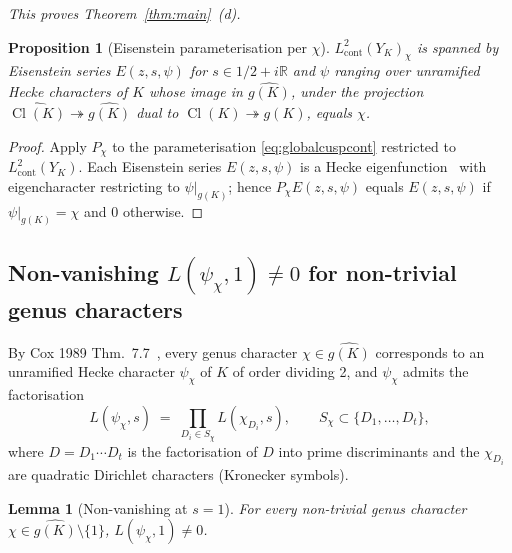 \documentclass[11pt,a4paper,reqno]{amsart}
\newtheorem{proposition}[theorem]{Proposition}
\newtheorem{lemma}[theorem]{Lemma}
\theoremstyle{definition}
\DeclareMathOperator{\Cl}{Cl}
\newcommand{\RR}{\mathbb{R}}
\newcommand{\YK}{Y_K}
\newcommand{\gK}{g(K)}
\newcommand{\dualgK}{\widehat{g(K)}}
\newcommand{\Lcont}{L^2_{\mathrm{cont}}}
\begin{document}
\emph{This proves Theorem~\ref{thm:main}~(d).}

\begin{proposition}[Eisenstein parameterisation per $\chi$]\label{prop:Eisparam}
$\Lcont(\YK)_\chi$ is spanned by Eisenstein series $E(z,s,\psi)$ for $s\in 1/2+i\RR$ and $\psi$ ranging over unramified Hecke characters of $K$ whose image in $\dualgK$, under the projection $\widehat{\Cl(K)}\twoheadrightarrow\dualgK$ dual to $\Cl(K)\twoheadrightarrow\gK$, equals $\chi$.
\end{proposition}

\begin{proof}
Apply $P_\chi$ to the parameterisation \eqref{eq:globalcuspcont} restricted to $\Lcont(\YK)$. Each Eisenstein series $E(z,s,\psi)$ is a Hecke eigenfunction~\cite[Thm.~7.5]{ElstrodtGrunewaldMennicke1998} with eigencharacter restricting to $\psi\big|_{\gK}$; hence $P_\chi E(z,s,\psi)$ equals $E(z,s,\psi)$ if $\psi\big|_{\gK}=\chi$ and 0 otherwise.
\end{proof}

\subsection{Non-vanishing $L(\psi_\chi,1)\neq 0$ for non-trivial genus characters}\label{ss:nonvan}

By Cox 1989 Thm.~7.7~\cite{Cox1989}, every genus character $\chi\in\dualgK$ corresponds to an unramified Hecke character $\psi_\chi$ of $K$ of order dividing 2, and $\psi_\chi$ admits the factorisation
\begin{equation}\label{eq:Lfactorisation}
  L(\psi_\chi, s) \;=\; \prod_{D_i\in S_\chi} L(\chi_{D_i}, s),
  \qquad S_\chi\subset\{D_1,\ldots,D_t\},
\end{equation}
where $D = D_1\cdots D_t$ is the factorisation of $D$ into prime discriminants and the $\chi_{D_i}$ are quadratic Dirichlet characters (Kronecker symbols).

\begin{lemma}[Non-vanishing at $s=1$]\label{lem:Lchi1}
For every non-trivial genus character $\chi\in\dualgK\setminus\{1\}$, $L(\psi_\chi,1)\neq 0$.
\end{lemma}
\end{document}
